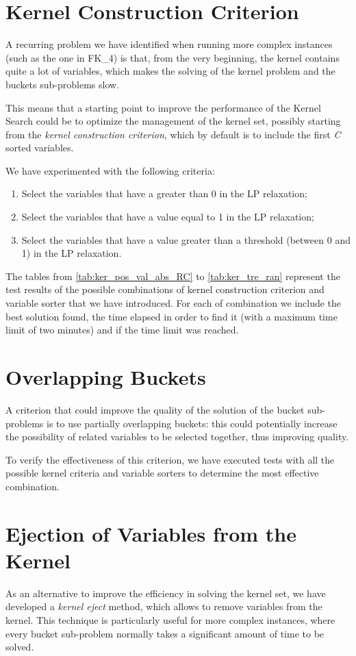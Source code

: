 \section{Kernel Construction Criterion}
A recurring problem we have identified when running more complex
instances (such as the one in FK\_4) is that,
from the very beginning, the kernel contains quite a lot of variables,
which makes the solving of the kernel problem and the buckets sub-problems slow.

This means that a starting point to improve the performance of the Kernel Search
could be to optimize the management of the kernel set,
possibly starting from the \textit{kernel construction criterion},
which by default is to include the first \textit{C} sorted variables.

We have experimented with the following criteria:
\begin{enumerate}
    \item Select the variables that have a greater than 0 in the LP relaxation;
    \item Select the variables that have a value equal to 1 in the LP relaxation;
    \item Select the variables that have a value greater than a threshold
    (between 0 and 1) in the LP relaxation.
\end{enumerate}

The tables from \ref{tab:ker_pos_val_abs_RC} to \ref{tab:ker_tre_ran} represent the test results of the possible
combinations of kernel construction criterion and variable sorter
that we have introduced.
For each of combination we include the best solution found, the time elapsed in order to find it (with a maximum time limit of two minutes) and if the time limit was reached.



\section{Overlapping Buckets}
A criterion that could improve the quality of the solution of the bucket
sub-problems is to use partially overlapping buckets:
this could potentially increase the possibility of related
variables to be selected together, thus improving quality.

To verify the effectiveness of this criterion, we have executed
tests with all the possible kernel criteria and variable sorters
to determine the most effective combination.

\section{Ejection of Variables from the Kernel}
As an alternative to improve the efficiency in solving the kernel set,
we have developed a \textit{kernel eject} method, which allows to remove variables from the kernel.
This technique is particularly useful for more complex instances, where every
bucket sub-problem normally takes a significant amount of time to be solved.

